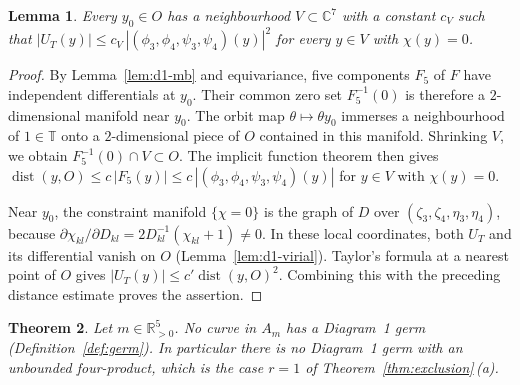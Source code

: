 \documentclass[Threeside,11pt]{article}
\newtheorem{theorem}{Theorem}[section]
\newtheorem{lemma}[theorem]{Lemma}
\theoremstyle{definition}
\theoremstyle{remark}
\numberwithin{equation}{section}
\newcommand{\C}{\mathbb C}\newcommand{\T}{\mathbb T}
\theoremstyle{remark}
\newcommand{\Rp}{\mathbb{R}_{>0}}
\begin{document}
\begin{lemma}\label{lem:d1-estimate}
Every $y_0\in O$ has a neighbourhood $V\subset\C^7$ with a constant $c_V$ such that
$|U_T(y)|\le c_V\,|(\phi_3,\phi_4,\psi_3,\psi_4)(y)|^2$ for every $y\in V$ with $\chi(y)=0$.
\end{lemma}

\begin{proof}
{By Lemma~\ref{lem:d1-mb} and equivariance, five components $F_5$ of $F$
have independent differentials at $y_0$.  Their common zero set $F_5^{-1}(0)$ is therefore
a $2$-dimensional manifold near $y_0$.  The orbit map $\theta\mapsto\theta y_0$ immerses
a neighbourhood of $1\in\mathbb T$ onto a $2$-dimensional piece of $O$ contained in this
manifold.  Shrinking $V$, we obtain $F_5^{-1}(0)\cap V\subset O$.
The implicit function theorem then gives
$\operatorname{dist}(y,O)\le c\,|F_5(y)|\le c\,|(\phi_3,\phi_4,\psi_3,\psi_4)(y)|$
for $y\in V$ with $\chi(y)=0$.

Near $y_0$, the constraint manifold $\{\chi=0\}$ is the graph of $D$ over
$(\zeta_3,\zeta_4,\eta_3,\eta_4)$, because
$\partial\chi_{kl}/\partial D_{kl}=2D_{kl}^{-1}(\chi_{kl}+1)\ne0$.
In these local coordinates, both $U_T$ and its differential vanish on $O$
(Lemma~\ref{lem:d1-virial}).  Taylor's formula at a nearest point of $O$ gives
$|U_T(y)|\le c'\operatorname{dist}(y,O)^2$.  Combining this with the preceding distance
estimate proves the assertion.}
\end{proof}

\begin{theorem}\label{thm:d1}
Let $m\in\Rp^5$.  No curve in $A_m$ has a Diagram~1 germ (Definition~\ref{def:germ}).  In
particular there is no Diagram~1 germ with an unbounded four-product, which is the case $r=1$ of
Theorem~\ref{thm:exclusion}\,(a).
\end{theorem}
\end{document}
